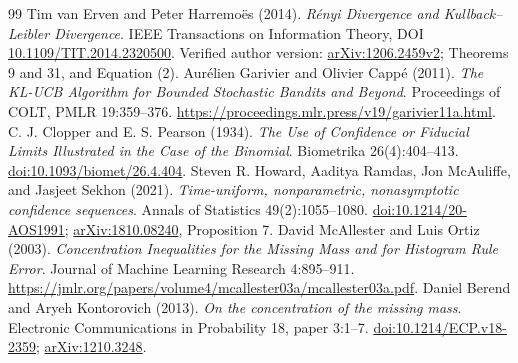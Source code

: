 \documentclass[11pt]{article}
\begin{document}
\begin{thebibliography}{99}
 Tim van Erven and Peter Harremo\"es (2014).
\emph{R\'enyi Divergence and Kullback--Leibler Divergence}.
IEEE Transactions on Information Theory, DOI
\href{https://doi.org/10.1109/TIT.2014.2320500}{10.1109/TIT.2014.2320500}.
Verified author version: \href{https://arxiv.org/abs/1206.2459v2}{arXiv:1206.2459v2};
Theorems 9 and 31, and Equation (2).
 Aur\'elien Garivier and Olivier Capp\'e (2011).
\emph{The KL-UCB Algorithm for Bounded Stochastic Bandits and Beyond}.
Proceedings of COLT, PMLR 19:359--376.
\url{https://proceedings.mlr.press/v19/garivier11a.html}.
 C. J. Clopper and E. S. Pearson (1934).
\emph{The Use of Confidence or Fiducial Limits Illustrated in the Case of the Binomial}.
Biometrika 26(4):404--413.
\href{https://doi.org/10.1093/biomet/26.4.404}{doi:10.1093/biomet/26.4.404}.
 Steven R. Howard, Aaditya Ramdas, Jon McAuliffe, and Jasjeet Sekhon (2021).
\emph{Time-uniform, nonparametric, nonasymptotic confidence sequences}.
Annals of Statistics 49(2):1055--1080.
\href{https://doi.org/10.1214/20-AOS1991}{doi:10.1214/20-AOS1991};
\href{https://arxiv.org/abs/1810.08240}{arXiv:1810.08240}, Proposition 7.
 David McAllester and Luis Ortiz (2003).
\emph{Concentration Inequalities for the Missing Mass and for Histogram Rule Error}.
Journal of Machine Learning Research 4:895--911.
\url{https://jmlr.org/papers/volume4/mcallester03a/mcallester03a.pdf}.
 Daniel Berend and Aryeh Kontorovich (2013).
\emph{On the concentration of the missing mass}.
Electronic Communications in Probability 18, paper 3:1--7.
\href{https://doi.org/10.1214/ECP.v18-2359}{doi:10.1214/ECP.v18-2359};
\href{https://arxiv.org/abs/1210.3248}{arXiv:1210.3248}.

\end{thebibliography}
\end{document}
